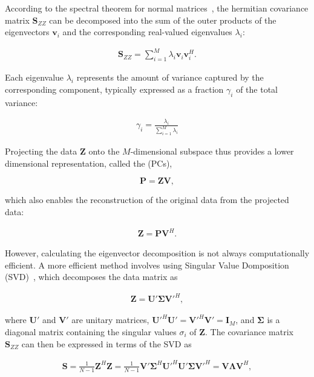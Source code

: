 According to the spectral theorem for normal matrices~\cite[e.g.][p. 133]{horn_matrix_2012}, the hermitian covariance matrix $\bm{S}_{ZZ}$ can be decomposed into the sum of the outer products of the eigenvectors $\bm{v}_i$ and the corresponding real-valued eigenvalues $\lambda_i$:

\begin{align}
    \bm{S}_{ZZ} = \sum_{i=1}^M \lambda_i \bm{v}_i \bm{v}_i^H.
\end{align}

Each eigenvalue $\lambda_i$ represents the amount of variance captured by the corresponding component, typically expressed as a fraction $\gamma_i$ of the total variance:

\begin{align}
    \gamma_i = \frac{\lambda_i}{\sum_{i=1}^M\lambda_i}
\end{align}

Projecting the data $\bm{Z}$ onto the $M$-dimensional subspace thus provides a lower dimensional representation, called the  (PCs),

\begin{equation}
    \bm{P} = \bm{Z} \bm{V},
\end{equation}

which also enables the reconstruction of the original data from the projected  data:

\begin{align}\label{eq:theory:pca_reconstruction}
    \bm{Z} = \bm{P} \bm{V}^H.
\end{align}

However, calculating the eigenvector decomposition is not always computationally efficient. A more efficient method involves using Singular Value Domposition (SVD)~\cite[e.g.][p. 150]{horn_matrix_2012}, which decomposes the data matrix as

\begin{align}\label{eq:theory:pca_svd}
    \bm{Z} = \bm{U}' \bm{\Sigma} {\bm{V}'}^H,
\end{align}

where $\bm{U}'$ and $\bm{V}'$ are unitary matrices, ${\bm{U}'}^H \bm{U}' = {\bm{V}'}^H \bm{V}' = \bm{I}_M$, and $\bm{\Sigma}$ is a diagonal matrix containing the singular values $\sigma_i$ of $\bm{Z}$. The covariance matrix $\bm{S}_{ZZ}$ can then be expressed in terms of the SVD as

\begin{align}
    \bm{S} = \frac{1}{N-1} \bm{Z}^H \bm{Z} = \frac{1}{N-1} \bm{V}' \bm{\Sigma}^H \bm{U}'^H \bm{U}' \bm{\Sigma} \bm{V}'^H = \bm{V} \bm{\Lambda} {\bm{V}}^H,
\end{align}

